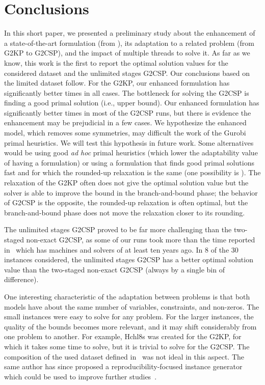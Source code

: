 \documentclass[9pt]{entcs}
\begin{document}
\section{Conclusions}

In this short paper, we presented a preliminary study about the enhancement of a state-of-the-art formulation (from \cite{furini:2016}), its adaptation to a related problem (from G2KP to G2CSP), and the impact of multiple threads to solve it.
As far as we know, this work is the first to report the optimal solution values for the considered dataset and the unlimited stages G2CSP.
Our conclusions based on the limited dataset follow.
For the G2KP, our enhanced formulation has significantly better times in all cases.
The bottleneck for solving the G2CSP is finding a good primal solution (i.e., upper bound).
Our enhanced formulation has significantly better times in most of the G2CSP runs, but there is evidence the enhancement may be prejudicial in a few cases.
We hypothesize the enhanced model, which removes some symmetries, may difficult the work of the Gurobi primal heuristics.
We will test this hypothesis in future work.
Some alternatives would be using good \emph{ad hoc} primal heuristics (which lower the adaptability value of having a formulation) or using a formulation that finds good primal solutions fast and for which the rounded-up relaxation is the same (one possibility is \cite{martin:2020:top}).
The relaxation of the G2KP often does not give the optimal solution value but the solver is able to improve the bound in the branch-and-bound phase; the behavior of G2CSP is the opposite, the rounded-up relaxation is often optimal, but the branch-and-bound phase does not move the relaxation closer to its rounding.

The unlimited stages G2CSP proved to be far more challenging than the two-staged non-exact G2CSP, as some of our runs took more than the time reported in~\cite{silva:2010} which has machines and solvers of at least ten years ago.
In 8 of the 30 instances considered, the unlimited stages G2CSP has a better optimal solution value than the two-staged non-exact G2CSP (always by a single bin of difference).

One interesting characteristic of the adaptation between problems is that both models have about the same number of variables, constraints, and non-zeros.
The small instances were easy to solve for any problem.
For the larger instances, the quality of the bounds becomes more relevant, and it may shift considerably from one problem to another.
For example, Hchl8s was created for the G2KP, for which it takes some time to solve, but it is trivial to solve for the G2CSP.
The composition of the used dataset defined in~\cite{silva:2010} was not ideal in this aspect.
The same author has since proposed a reproducibility-focused instance generator which could be used to improve further studies~\cite{silva:2014}.
\end{document}
